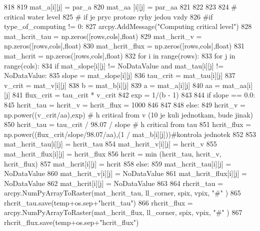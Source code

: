 \begin{DoxyCode}
818 
819       mat\_a[i][j] = par\_a
820       mat\_aa [i][j] = par\_aa
821 
822 
823 
824   \textcolor{comment}{# critical water level
}
825   \textcolor{comment}{# if je pryc protoze ryhy jedou vzdy
}
826   \textcolor{comment}{#if type\_of\_computing != 0:
}
827   arcpy.AddMessage(\textcolor{stringliteral}{"Computing critical level"})
828   mat\_hcrit\_tau = np.zeros([rows,cols],float)
829   mat\_hcrit\_v = np.zeros([rows,cols],float)
830   mat\_hcrit\_flux = np.zeros([rows,cols],float)
831   mat\_hcrit = np.zeros([rows,cols],float)
832   \textcolor{keywordflow}{for} i \textcolor{keywordflow}{in} range(rows):
833       \textcolor{keywordflow}{for} j \textcolor{keywordflow}{in} range(cols):
834           \textcolor{keywordflow}{if} mat\_slope[i][j] != NoDataValue \textcolor{keywordflow}{and} mat\_tau[i][j] != NoDataValue:
835               slope = mat\_slope[i][j]
836               tau\_crit = mat\_tau[i][j]
837               v\_crit = mat\_v[i][j]
838               b = mat\_b[i][j]
839               a = mat\_a[i][j]
840               aa = mat\_aa[i][j]
841               flux\_crit = tau\_crit * v\_crit
842               exp = 1/(b - 1)
843 
844               \textcolor{keywordflow}{if} slope == 0.0:
845                   hcrit\_tau = hcrit\_v = hcrit\_flux = 1000
846 
847 
848               \textcolor{keywordflow}{else}:
849                   hcrit\_v = np.power((v\_crit/aa),exp) \textcolor{comment}{# h critical from v (10 je kuli jednotkam, bude
       jinak)
}
850                   hcrit\_tau = tau\_crit / 98.07 / slope \textcolor{comment}{# h critical from tau
}
851                   hcrit\_flux = np.power((flux\_crit/slope/98.07/aa),(1 / mat\_b[i][j]))\textcolor{comment}{#kontrola jednotek
}
852 
853               mat\_hcrit\_tau[i][j] = hcrit\_tau
854               mat\_hcrit\_v[i][j] = hcrit\_v
855               mat\_hcrit\_flux[i][j] = hcrit\_flux
856               hcrit = min (hcrit\_tau, hcrit\_v, hcrit\_flux)
857               mat\_hcrit[i][j] = hcrit
858           \textcolor{keywordflow}{else}:
859               mat\_hcrit\_tau[i][j] = NoDataValue
860               mat\_hcrit\_v[i][j] = NoDataValue
861               mat\_hcrit\_flux[i][j] = NoDataValue
862               mat\_hcrit[i][j] = NoDataValue
863 
864   rhcrit\_tau = arcpy.NumPyArrayToRaster(mat\_hcrit\_tau, ll\_corner, spix, vpix, \textcolor{stringliteral}{"#"} )
865   rhcrit\_tau.save(temp+os.sep+\textcolor{stringliteral}{"hcrit\_tau"})
866   rhcrit\_flux = arcpy.NumPyArrayToRaster(mat\_hcrit\_flux, ll\_corner, spix, vpix, \textcolor{stringliteral}{"#"} )
867   rhcrit\_flux.save(temp+os.sep+\textcolor{stringliteral}{"hcrit\_flux"})

\end{DoxyCode}
